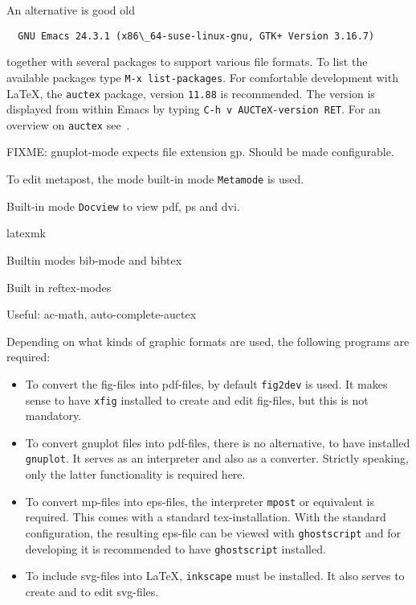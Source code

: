 An alternative is good old 
%
\begin{verbatim}
  GNU Emacs 24.3.1 (x86\_64-suse-linux-gnu, GTK+ Version 3.16.7)
\end{verbatim}
%
together with several packages to support 
various file formats. 
To list the available packages type 
\texttt{M-x list-packages}. 
For comfortable development with \LaTeX, 
the \texttt{auctex} package, version \texttt{11.88} is recommended. 
The version is displayed from within Emacs 
by typing \texttt{C-h v AUCTeX-version RET}. 
For an overview on \texttt{auctex} see~\cite{AucTeX}. 


FIXME\@: gnuplot-mode expects file extension gp. 
Should be made configurable. 

To edit metapost, the mode built-in mode \texttt{Metamode} is used. 

Built-in mode \texttt{Docview} to view pdf, ps and dvi. 

latexmk

Builtin modes bib-mode and bibtex

Built in reftex-modes

Useful: 
ac-math, auto-complete-auctex

Depending on what kinds of graphic formats are used, 
the following programs are required: 
%
\begin{itemize}
\item
To convert the \gls{fig}-files into \gls{pdf}-files, 
by default \texttt{fig2dev} is used. 
It makes sense to have \texttt{xfig} installed 
to create and edit fig-files, but this is not mandatory. 
\item
To convert gnuplot files into pdf-files, there is no alternative, 
to have installed \texttt{gnuplot}. 
It serves as an interpreter and also as a converter. 
Strictly speaking, only the latter functionality is required here. 
\item
To convert \gls{mp}-files into \gls{eps}-files, 
the interpreter \texttt{mpost} or equivalent is required. 
This comes with a standard tex-installation. 
With the standard configuration, 
the resulting eps-file can be viewed with \texttt{ghostscript} 
and for developing it is recommended to have \texttt{ghostscript} installed. 
\item
To include \gls{svg}-files into \LaTeX{}, 
\texttt{inkscape} must be installed. 
It also serves to create and to edit svg-files. 
\end{itemize}


